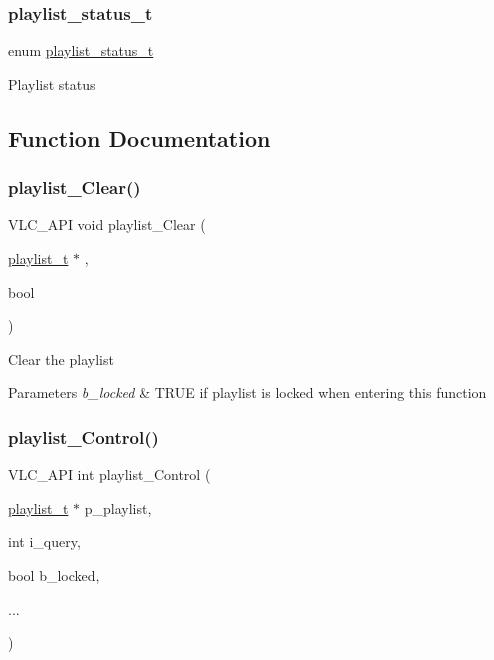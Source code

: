 \subsubsection{\texorpdfstring{playlist\+\_\+status\+\_\+t}{playlist\_status\_t}}
{\footnotesize\ttfamily enum \hyperlink{group__vlc__playlist_gaccdaf2247d258fb3d8d6cb008a7d0cfa}{playlist\+\_\+status\+\_\+t}}

Playlist status 

\subsection{Function Documentation}
\mbox{\label{group__vlc__playlist_ga08a4c79407d2cde206127095aa7baa13}} 
\subsubsection{\texorpdfstring{playlist\+\_\+\+Clear()}{playlist\_Clear()}}
{\footnotesize\ttfamily V\+L\+C\+\_\+\+A\+PI void playlist\+\_\+\+Clear (\begin{DoxyParamCaption}\item[{\hyperlink{structplaylist__t}{playlist\+\_\+t} $\ast$}]{,  }\item[{bool}]{ }\end{DoxyParamCaption})}

Clear the playlist 
\begin{DoxyParams}{Parameters}
{\em b\+\_\+locked} & T\+R\+UE if playlist is locked when entering this function \\
\hline
\end{DoxyParams}
\mbox{\label{group__vlc__playlist_ga3f0e893ab6167f3c85067330cb5f2b78}} 
\subsubsection{\texorpdfstring{playlist\+\_\+\+Control()}{playlist\_Control()}}
{\footnotesize\ttfamily V\+L\+C\+\_\+\+A\+PI int playlist\+\_\+\+Control (\begin{DoxyParamCaption}\item[{\hyperlink{structplaylist__t}{playlist\+\_\+t} $\ast$}]{p\+\_\+playlist,  }\item[{int}]{i\+\_\+query,  }\item[{bool}]{b\+\_\+locked,  }\item[{}]{... }\end{DoxyParamCaption})}

